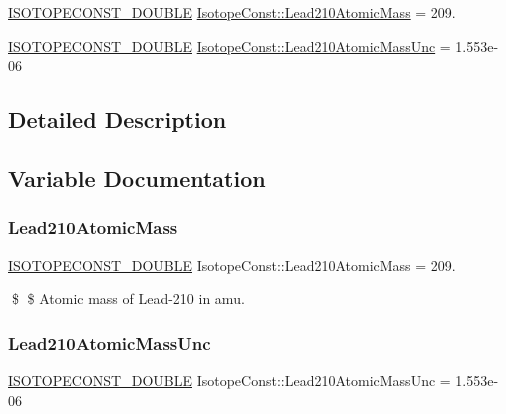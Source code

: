 \begin{DoxyCompactItemize}
\item 
\mbox{\hyperlink{group___isotope_const-_macros_ga8f45a7272ce02c0b4c65c44636ed719a}{I\+S\+O\+T\+O\+P\+E\+C\+O\+N\+S\+T\+\_\+\+D\+O\+U\+B\+LE}} \mbox{\hyperlink{group___isotope_const-_lead-_pb210_gac315ffae750b266f210286e871dc692b}{Isotope\+Const\+::\+Lead210\+Atomic\+Mass}} = 209.
\item 
\mbox{\hyperlink{group___isotope_const-_macros_ga8f45a7272ce02c0b4c65c44636ed719a}{I\+S\+O\+T\+O\+P\+E\+C\+O\+N\+S\+T\+\_\+\+D\+O\+U\+B\+LE}} \mbox{\hyperlink{group___isotope_const-_lead-_pb210_ga2ca1df3bfb42d619dc348879bc4181b7}{Isotope\+Const\+::\+Lead210\+Atomic\+Mass\+Unc}} = 1.\+553e-\/06
\end{DoxyCompactItemize}


\subsection{Detailed Description}


\subsection{Variable Documentation}
\mbox{\label{group___isotope_const-_lead-_pb210_gac315ffae750b266f210286e871dc692b}} 
\subsubsection{\texorpdfstring{Lead210\+Atomic\+Mass}{Lead210AtomicMass}}
{\footnotesize\ttfamily \mbox{\hyperlink{group___isotope_const-_macros_ga8f45a7272ce02c0b4c65c44636ed719a}{I\+S\+O\+T\+O\+P\+E\+C\+O\+N\+S\+T\+\_\+\+D\+O\+U\+B\+LE}} Isotope\+Const\+::\+Lead210\+Atomic\+Mass = 209.}

\$ \$ Atomic mass of Lead-\/210 in amu. \mbox{\label{group___isotope_const-_lead-_pb210_ga2ca1df3bfb42d619dc348879bc4181b7}} 
\subsubsection{\texorpdfstring{Lead210\+Atomic\+Mass\+Unc}{Lead210AtomicMassUnc}}
{\footnotesize\ttfamily \mbox{\hyperlink{group___isotope_const-_macros_ga8f45a7272ce02c0b4c65c44636ed719a}{I\+S\+O\+T\+O\+P\+E\+C\+O\+N\+S\+T\+\_\+\+D\+O\+U\+B\+LE}} Isotope\+Const\+::\+Lead210\+Atomic\+Mass\+Unc = 1.\+553e-\/06}

